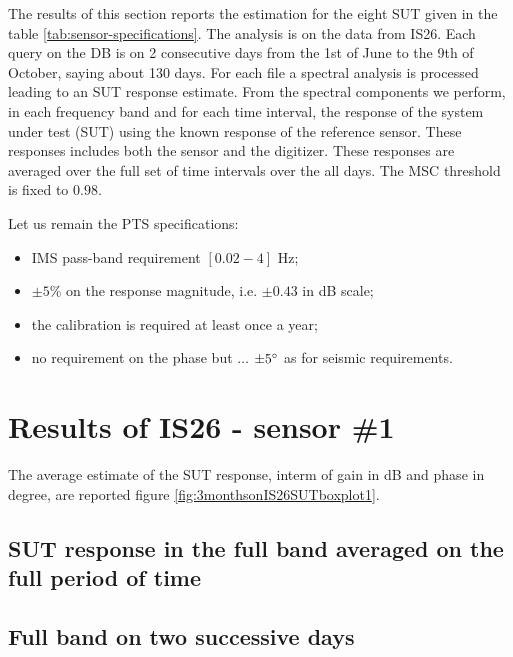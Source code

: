 The results of this section reports the estimation for the eight SUT given in the table \ref{tab:sensor-specifications}.
The analysis is on the data from IS26. Each query on the DB is on 2 consecutive days from the 1st of June to the 9th of October, saying about 130 days. For each file a spectral analysis is processed leading to an SUT response estimate. From the spectral components we perform, in each frequency band and for each time interval, the response of the system under test (SUT) using the known response of the reference sensor. These responses includes both the sensor and the digitizer. These responses are averaged over the full set of time intervals over the all days. The  MSC threshold is fixed to $0.98$. 

Let us remain the PTS specifications:
\begin{itemize}
\item
IMS pass-band requirement $[0.02 - 4]$ Hz;
 \item
$\pm 5\%$ on the response magnitude, i.e. $\pm 0.43$ in dB scale;
\item
the calibration is required at least once a year;
 \item
no requirement  on the phase but $\ldots$ $\pm 5^{\circ}$ as for seismic requirements.
\end{itemize}


 \newpage
\section{Results of IS26 - sensor \#1}
The average estimate of the SUT response, interm of gain in dB and phase in degree, are reported figure \ref{fig:3monthsonIS26SUTboxplot1}.
\subsection{SUT response in the full band averaged on the full period of time}

\subsection{Full band on two successive days}

